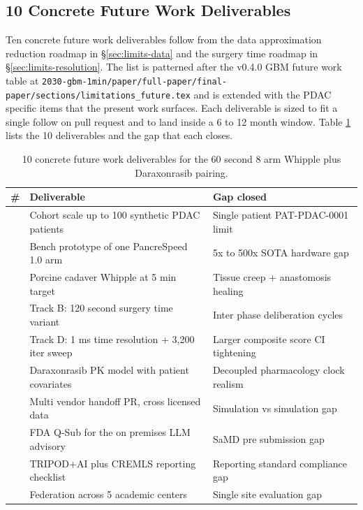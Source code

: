 \subsection{10 Concrete Future Work Deliverables}
\label{sec:limits-future}

Ten concrete future work deliverables follow from the data
approximation reduction roadmap in \S \ref{sec:limits-data} and
the surgery time roadmap in \S \ref{sec:limits-resolution}. The
list is patterned after the v0.4.0 GBM future work table at
\texttt{2030-gbm-1min/paper/full-paper/final-paper/sections/limitations_future.tex}
\cite{kawchak_2026_20113157} and is extended with the PDAC
specific items that the present work surfaces. Each deliverable
is sized to fit a single follow on pull request and to land
inside a 6 to 12 month window. Table \ref{tab:limits-future}
lists the 10 deliverables and the gap that each closes.

\begin{table}[H]
\caption{10 concrete future work deliverables for the 60 second 8 arm Whipple plus Daraxonrasib pairing.}
\label{tab:limits-future}
\centering
\begin{tabular}{>{\raggedright\arraybackslash}p{0.7cm} >{\raggedright\arraybackslash}p{8cm} >{\raggedright\arraybackslash}p{6.7cm}}
\toprule
\textbf{\#} & \textbf{Deliverable} & \textbf{Gap closed} \\
\midrule
  1 & Cohort scale up to 100 synthetic PDAC patients & Single patient PAT-PDAC-0001 limit \\
  2 & Bench prototype of one PancreSpeed 1.0 arm & 5x to 500x SOTA hardware gap \\
  3 & Porcine cadaver Whipple at 5 min target & Tissue creep + anastomosis healing \\
  4 & Track B: 120 second surgery time variant & Inter phase deliberation cycles \\
  5 & Track D: 1 ms time resolution + 3,200 iter sweep & Larger composite score CI tightening \\
  6 & Daraxonrasib PK model with patient covariates & Decoupled pharmacology clock realism \\
  7 & Multi vendor handoff PR, cross licensed data & Simulation vs simulation gap \\
  8 & FDA Q-Sub for the on premises LLM advisory & SaMD pre submission gap \\
  9 & TRIPOD+AI plus CREMLS reporting checklist & Reporting standard compliance gap \\
  10 & Federation across 5 academic centers & Single site evaluation gap \\
\bottomrule
\end{tabular}
\end{table}
